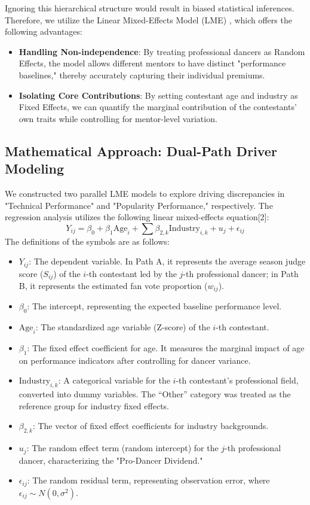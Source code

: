 \documentclass[12pt]{article}
\begin{document}
	Ignoring this hierarchical structure \cite{ref4} would result in biased statistical inferences. Therefore, we utilize the Linear Mixed-Effects Model (LME) \cite{refAI}, which offers the following advantages:
	\begin{itemize}
		\item \textbf{Handling Non-independence}: By treating professional dancers as Random Effects, the model allows different mentors to have distinct "performance baselines," thereby accurately capturing their individual premiums.
		\item \textbf{Isolating Core Contributions}: By setting contestant age and industry as Fixed Effects, we can quantify the marginal contribution of the contestants' own traits while controlling for mentor-level variation.
	\end{itemize}
	
	\subsection{Mathematical Approach: Dual-Path Driver Modeling}
	We constructed two parallel LME models to explore driving discrepancies in "Technical Performance" and "Popularity Performance," respectively. The regression analysis utilizes the following linear mixed-effects equation[2]: 
	$$Y_{ij} = \beta_0 + \beta_1 \text{Age}_{i} + \sum \beta_{2,k} \text{Industry}_{i,k} + u_j + \epsilon_{ij}$$
	The definitions of the symbols are as follows:
	\begin{itemize}
		\item $Y_{ij}$: The dependent variable. In Path A, it represents the average season judge score ($S_{ij}$) of the $i$-th contestant led by the $j$-th professional dancer; in Path B, it represents the estimated fan vote proportion ($w_{ij}$).
		\item $\beta_0$: The intercept, representing the expected baseline performance level.
		\item $\text{Age}_{i}$: The standardized age variable (Z-score) of the $i$-th contestant.
		\item $\beta_1$: The fixed effect coefficient for age. It measures the marginal impact of age on performance indicators after controlling for dancer variance.
		\item $\text{Industry}_{i,k}$: A categorical variable for the $i$-th contestant's professional field, converted into dummy variables. The ``Other'' category was treated as the reference group for industry fixed effects.
		\item $\beta_{2,k}$: The vector of fixed effect coefficients for industry backgrounds.
		\item $u_j$: The random effect term (random intercept) for the $j$-th professional dancer, characterizing the "Pro-Dancer Dividend."
		\item $\epsilon_{ij}$: The random residual term, representing observation error, where $\epsilon_{ij} \sim N(0, \sigma^2)$.
	\end{itemize}
	
\end{document}
